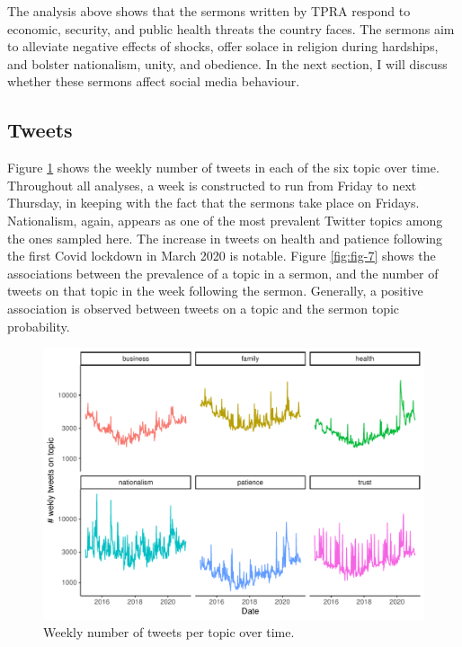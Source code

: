 \documentclass[
  12pt,
]{article}
\begin{document}
The analysis above shows that the sermons written by TPRA respond to economic, security, and public health threats the country faces. The sermons aim to alleviate negative effects of shocks, offer solace in religion during hardships, and bolster nationalism, unity, and obedience. In the next section, I will discuss whether these sermons affect social media behaviour.

\hypertarget{tweets}{%
\subsection{Tweets}\label{tweets}}

Figure \ref{fig:fig-6} shows the weekly number of tweets in each of the six topic over time. Throughout all analyses, a week is constructed to run from Friday to next Thursday, in keeping with the fact that the sermons take place on Fridays. Nationalism, again, appears as one of the most prevalent Twitter topics among the ones sampled here. The increase in tweets on health and patience following the first Covid lockdown in March 2020 is notable. Figure \ref{fig:fig-7} shows the associations between the prevalence of a topic in a sermon, and the number of tweets on that topic in the week following the sermon. Generally, a positive association is observed between tweets on a topic and the sermon topic probability.

\begin{figure}
\centering
\includegraphics{Khutbas_files/figure-latex/Tweets.pdf}
\caption{\label{fig:fig-6}Weekly number of tweets per topic over time.}
\end{figure}
\end{document}
